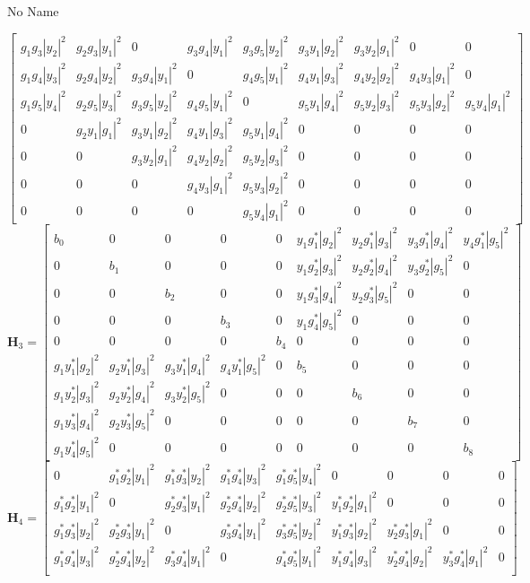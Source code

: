 \documentclass[a4paper,10pt]{article}
\begin{document}
\begin{section}{No Name}
\begin{landscape}
\begin{equation}
\begin{bmatrix}
g_1g_3|y_2|^2&g_2g_3|y_1|^2&0&g_3g_4|y_1|^2&g_3g_5|y_2|^2&g_3y_1|g_2|^2&g_3y_2|g_1|^2&0&0\\
g_1g_4|y_3|^2&g_2g_4|y_2|^2&g_3g_4|y_1|^2&0&g_4g_5|y_1|^2&g_4y_1|g_3|^2&g_4y_2|g_2|^2&g_4y_3|g_1|^2&0\\
g_1g_5|y_4|^2&g_2g_5|y_3|^2&g_3g_5|y_2|^2&g_4g_5|y_1|^2&0&g_5y_1|g_4|^2&g_5y_2|g_3|^2&g_5y_3|g_2|^2&g_5y_4|g_1|^2\\
0&g_2y_1|g_1|^2&g_3y_1|g_2|^2&g_4y_1|g_3|^2&g_5y_1|g_4|^2&0&0&0&0\\
0&0&g_3y_2|g_1|^2&g_4y_2|g_2|^2&g_5y_2|g_3|^2&0&0&0&0\\
0&0&0&g_4y_3|g_1|^2&g_5y_3|g_2|^2&0&0&0&0\\
0&0&0&0&g_5y_4|g_1|^2&0&0&0&0
\end{bmatrix}
\end{equation}
\begin{equation}
\boldsymbol{H}_3 = 
\begin{bmatrix}
b_{0}&0&0&0&0&y_1g_1^*|g_2|^2&y_2g_1^*|g_3|^2&y_3g_1^*|g_4|^2&y_4g_1^*|g_5|^2\\
0&b_{1}&0&0&0&y_1g_2^*|g_3|^2&y_2g_2^*|g_4|^2&y_3g_2^*|g_5|^2&0\\
0&0&b_{2}&0&0&y_1g_3^*|g_4|^2&y_2g_3^*|g_5|^2&0&0\\
0&0&0&b_{3}&0&y_1g_4^*|g_5|^2&0&0&0\\
0&0&0&0&b_{4}&0&0&0&0\\
g_1y_1^*|g_2|^2&g_2y_1^*|g_3|^2&g_3y_1^*|g_4|^2&g_4y_1^*|g_5|^2&0&b_{5}&0&0&0\\
g_1y_2^*|g_3|^2&g_2y_2^*|g_4|^2&g_3y_2^*|g_5|^2&0&0&0&b_{6}&0&0\\
g_1y_3^*|g_4|^2&g_2y_3^*|g_5|^2&0&0&0&0&0&b_{7}&0\\
g_1y_4^*|g_5|^2&0&0&0&0&0&0&0&b_{8}
\end{bmatrix}
\end{equation}
\begin{equation}
\boldsymbol{H}_4 = 
\begin{bmatrix}
0&g_1^*g_2^*|y_1|^2&g_1^*g_3^*|y_2|^2&g_1^*g_4^*|y_3|^2&g_1^*g_5^*|y_4|^2&0&0&0&0\\
g_1^*g_2^*|y_1|^2&0&g_2^*g_3^*|y_1|^2&g_2^*g_4^*|y_2|^2&g_2^*g_5^*|y_3|^2&y_1^*g_2^*|g_1|^2&0&0&0\\
g_1^*g_3^*|y_2|^2&g_2^*g_3^*|y_1|^2&0&g_3^*g_4^*|y_1|^2&g_3^*g_5^*|y_2|^2&y_1^*g_3^*|g_2|^2&y_2^*g_3^*|g_1|^2&0&0\\
g_1^*g_4^*|y_3|^2&g_2^*g_4^*|y_2|^2&g_3^*g_4^*|y_1|^2&0&g_4^*g_5^*|y_1|^2&y_1^*g_4^*|g_3|^2&y_2^*g_4^*|g_2|^2&y_3^*g_4^*|g_1|^2&0\\

\end{bmatrix}
\end{equation}
\end{landscape}
\end{section}
\end{document}
